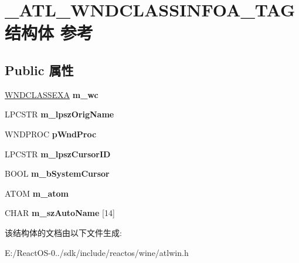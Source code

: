 \hypertarget{struct___a_t_l___w_n_d_c_l_a_s_s_i_n_f_o_a___t_a_g}{}\section{\+\_\+\+A\+T\+L\+\_\+\+W\+N\+D\+C\+L\+A\+S\+S\+I\+N\+F\+O\+A\+\_\+\+T\+A\+G结构体 参考}
\label{struct___a_t_l___w_n_d_c_l_a_s_s_i_n_f_o_a___t_a_g}
\subsection*{Public 属性}
\begin{DoxyCompactItemize}
\item 
\mbox{\label{struct___a_t_l___w_n_d_c_l_a_s_s_i_n_f_o_a___t_a_g_ad0c271611e1d26d39e26f5eb8558a231}} 
\hyperlink{struct___w_n_d_c_l_a_s_s_e_x_a}{W\+N\+D\+C\+L\+A\+S\+S\+E\+XA} {\bfseries m\+\_\+wc}
\item 
\mbox{\label{struct___a_t_l___w_n_d_c_l_a_s_s_i_n_f_o_a___t_a_g_a63fd388ed775208fd0a5ec3bdafc795f}} 
L\+P\+C\+S\+TR {\bfseries m\+\_\+lpsz\+Orig\+Name}
\item 
\mbox{\label{struct___a_t_l___w_n_d_c_l_a_s_s_i_n_f_o_a___t_a_g_a9330f5ed017a881905db53c70098526a}} 
W\+N\+D\+P\+R\+OC {\bfseries p\+Wnd\+Proc}
\item 
\mbox{\label{struct___a_t_l___w_n_d_c_l_a_s_s_i_n_f_o_a___t_a_g_aeb06dcd4ce486adccf175567a26237b2}} 
L\+P\+C\+S\+TR {\bfseries m\+\_\+lpsz\+Cursor\+ID}
\item 
\mbox{\label{struct___a_t_l___w_n_d_c_l_a_s_s_i_n_f_o_a___t_a_g_ae1e07a78d21db78a0c02ec94fb6449d4}} 
B\+O\+OL {\bfseries m\+\_\+b\+System\+Cursor}
\item 
\mbox{\label{struct___a_t_l___w_n_d_c_l_a_s_s_i_n_f_o_a___t_a_g_a9a804e924489a039d6e1e1fa1c1278d6}} 
A\+T\+OM {\bfseries m\+\_\+atom}
\item 
\mbox{\label{struct___a_t_l___w_n_d_c_l_a_s_s_i_n_f_o_a___t_a_g_ad210965615f5f64e3b78474465ab4081}} 
C\+H\+AR {\bfseries m\+\_\+sz\+Auto\+Name} \mbox{[}14\mbox{]}
\end{DoxyCompactItemize}


该结构体的文档由以下文件生成\+:\begin{DoxyCompactItemize}
\item 
E\+:/\+React\+O\+S-\/0../sdk/include/reactos/wine/atlwin.\+h\end{DoxyCompactItemize}
